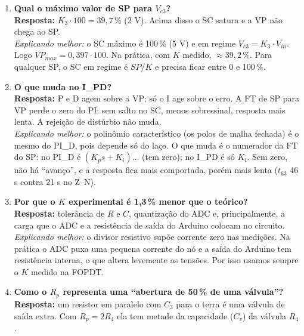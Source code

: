 \documentclass[11pt,a4paper]{article}
\newcommand{\Vc}[1]{V_{c#1}}
\newcommand{\Vin}{V_{in}}
\begin{document}
\begin{enumerate}[leftmargin=*]
\emph{Explicando melhor:} a ação integral soma o erro no tempo. Se pedimos 45\,\% mas o circuito só chega a 39,7\,\%, o erro nunca zera e a integral cresce (a saída calculada passa de 100\,\%, mas o atuador só entrega 100\,\%). Ao baixar o SP para 30\,\%, o erro fica negativo, mas a integral acumulada ainda é grande e mantém o SC em 100\,\% por muito tempo (na simulação, $\approx465$ s contra $\approx74$ s com anti-windup).
\item \textbf{Qual o máximo valor de SP para $\Vc3$?}\\
\textbf{Resposta:} $K_3\cdot100=39{,}7\,\%$ (2 V). Acima disso o SC satura e a VP não chega ao SP.\\
\emph{Explicando melhor:} o SC máximo é 100\,\% (5 V) e em regime $\Vc3=K_3\cdot\Vin$. Logo $VP_{max}=0{,}397\cdot100$. Na prática, com $K$ medido, $\approx39{,}2\,\%$. Para qualquer SP, o SC em regime é $SP/K$ e precisa ficar entre 0 e 100\,\%.
\item \textbf{O que muda no I\_PD?}\\
\textbf{Resposta:} P e D agem sobre a VP; só o I age sobre o erro. A FT de SP para VP perde o zero do PI: sem salto no SC, menos sobressinal, resposta mais lenta. A rejeição de distúrbio não muda.\\
\emph{Explicando melhor:} o polinômio característico (os polos de malha fechada) é o mesmo do PI\_D, pois depende só do laço. O que muda é o numerador da FT do SP: no PI\_D é $(K_ps+K_i)\ldots$ (tem zero); no I\_PD é só $K_i$. Sem zero, não há ``avanço'', e a resposta fica mais comportada, porém mais lenta ($t_{63}$ 46 s contra 21 s no Z--N).
\item \textbf{Por que o $K$ experimental é 1,3\,\% menor que o teórico?}\\
\textbf{Resposta:} tolerância de $R$ e $C$, quantização do ADC e, principalmente, a carga que o ADC e a resistência de saída do Arduino colocam no circuito.\\
\emph{Explicando melhor:} o divisor resistivo supõe corrente zero nas medições. Na prática o ADC puxa uma pequena corrente do nó e a saída do Arduino tem resistência interna, o que altera levemente as tensões. Por isso usamos sempre o $K$ medido na FOPDT.
\item \textbf{Como o $R_p$ representa uma ``abertura de 50\,\% de uma válvula''?}\\
\textbf{Resposta:} um resistor em paralelo com $C_3$ para o terra é uma válvula de saída extra. Com $R_p=2R_4$ ela tem metade da capacidade ($C_v$) da válvula $R_4$.\\

\end{enumerate}
\end{document}
